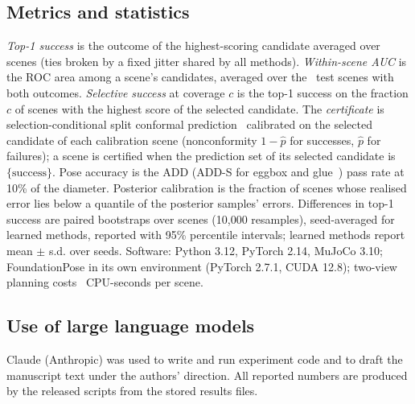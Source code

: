 \subsection{Metrics and statistics}
\emph{Top-1 success} is the outcome of the highest-scoring candidate averaged over scenes (ties broken by a fixed jitter shared by all methods). \emph{Within-scene AUC} is the ROC area among a scene's candidates, averaged over the \NMixed\ test scenes with both outcomes. \emph{Selective success} at coverage $c$ is the top-1 success on the fraction $c$ of scenes with the highest score of the selected candidate. The \emph{certificate} is selection-conditional split conformal prediction~\cite{vovk2005,angelopoulos2023} calibrated on the selected candidate of each calibration scene (nonconformity $1-\hat p$ for successes, $\hat p$ for failures); a scene is certified when the prediction set of its selected candidate is $\{\text{success}\}$. Pose accuracy is the ADD (ADD-S for eggbox and glue~\cite{hodan2016eval}) pass rate at 10\% of the diameter. Posterior calibration is the fraction of scenes whose realised error lies below a quantile of the posterior samples' errors. Differences in top-1 success are paired bootstraps over scenes (10,000 resamples), seed-averaged for learned methods, reported with 95\% percentile intervals; learned methods report mean $\pm$ s.d. over seeds. Software: Python 3.12, PyTorch 2.14, MuJoCo 3.10; FoundationPose in its own environment (PyTorch 2.7.1, CUDA 12.8); two-view planning costs \CpuTwoView\ CPU-seconds per scene.

\subsection{Use of large language models}
Claude (Anthropic) was used to write and run experiment code and to draft the manuscript text under the authors' direction. All reported numbers are produced by the released scripts from the stored results files.
